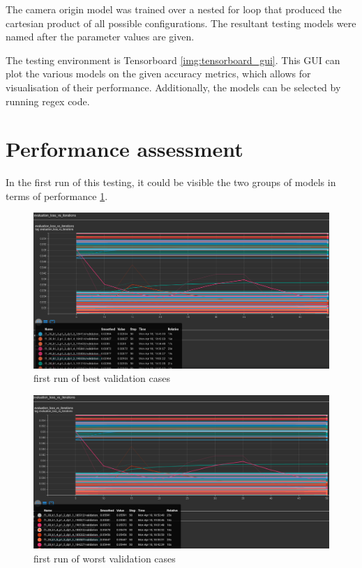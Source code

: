 \documentclass[
    11pt,
    oneside
]{report}
\begin{document}
The camera origin model was trained over a nested for loop that produced the cartesian product of all possible configurations. The resultant testing models were named after the parameter values are given.



The testing environment is Tensorboard \ref{img:tensorboard_gui}. This GUI can plot the various models on the given accuracy metrics, which allows for visualisation of their performance. Additionally, the models can be selected by running regex code.




\section{Performance assessment}



In the first run of this testing, it could be visible the two groups of models in terms of performance \ref{img:1best_cases}.

\begin{figure}[H]
    \includegraphics[keepaspectratio, width=\columnwidth]{Screenshot_2022-04-20_23-15-30.png}
    \caption{first run of best validation cases}
    \label{img:1best_cases}
\end{figure}

\begin{figure}[H]
    \includegraphics[keepaspectratio, width=\columnwidth]{Screenshot_2022-04-20_23-20-48.png}
    \caption{first run of worst validation cases}
    \label{img:1worst_cases}
\end{figure}
\end{document}
